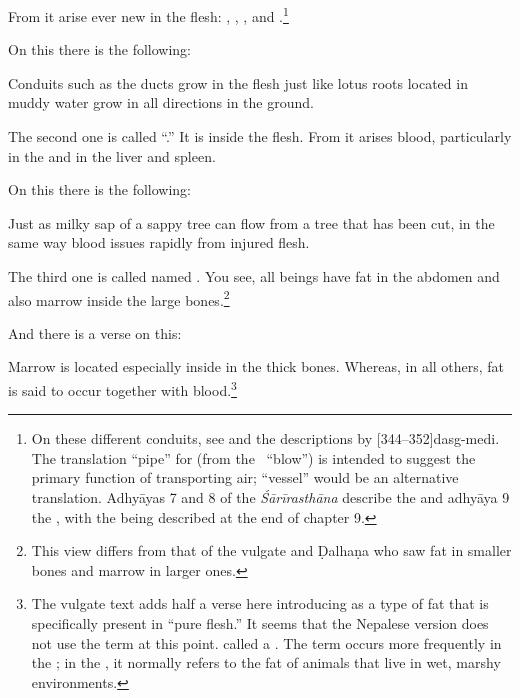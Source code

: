 \begin{translation}
From it arise ever new  in the flesh:
, , , and
.\footnote{On these different conduits, see
    \cites[404--406]{wuja-2022}[xlvi--xlvii]{wuja-2003}[26--28]{ray-1980} and 
    the descriptions by 
    [344--352]{dasg-medi}. The translation
    “pipe” for  (from the \root\, “blow”) is
    intended to suggest the primary function of transporting air;
    “vessel” would be an alternative translation. Adhyāyas 
    7 and 8 of the \emph{Śārīrasthāna} describe the  and adhyāya 9 
    the , with the  being described at the end of 
    chapter 9.}
  
\item[9]

On this there is the following:

\begin{sloka}
Conduits such as the ducts grow in the flesh just like lotus roots located in 
muddy water grow in all directions in the ground.
\end{sloka}

 \item[10]
 
The second one is called “.” It is inside the 
flesh. 
From it arises blood, particularly in the  and in the
liver and spleen.
 
\item[11]

On this there is the following:

\begin{sloka}
    Just as milky sap of a sappy tree can flow from a tree that has been cut, 
    in the same way blood issues rapidly from injured flesh.
\end{sloka}

 
 
 \item[12]
 
The third one is called named  .  You
see, all beings have fat in the abdomen and also marrow inside the large 
bones.\footnote{This view differs from that of the vulgate and Ḍalhaṇa who 
saw fat in smaller bones and marrow in larger ones.}
 
 \item[13]
 
 And there is a verse on this:
 
\begin{sloka}
Marrow is located especially inside in the thick bones.  Whereas, in
all others, fat is said to occur together with blood.\footnote{The
    vulgate text adds half a verse here introducing  as a type
    of fat that is specifically present in “pure flesh.”  It seems that
    the Nepalese version does not use the term  at this 
    point.
     called  a 
    .   The term occurs more frequently in the \CS; in the \SS, it normally 
    refers to the fat of animals that live in wet, marshy environments.}
\end{sloka} 



\end{translation}

